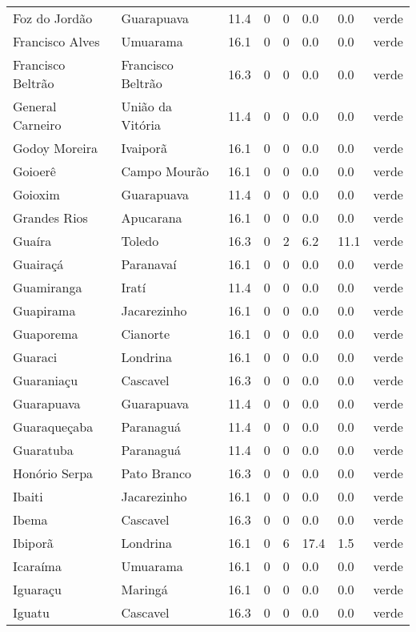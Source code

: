 \begin{longtable}{l|lllllll}
  Foz do Jordão & Guarapuava & 11.4 & 0 & 0 & 0.0 & 0.0 & verde \\ 
  Francisco Alves & Umuarama & 16.1 & 0 & 0 & 0.0 & 0.0 & verde \\ 
  Francisco Beltrão & Francisco Beltrão & 16.3 & 0 & 0 & 0.0 & 0.0 & verde \\ 
  General Carneiro & União da Vitória & 11.4 & 0 & 0 & 0.0 & 0.0 & verde \\ 
  Godoy Moreira & Ivaiporã & 16.1 & 0 & 0 & 0.0 & 0.0 & verde \\ 
  Goioerê & Campo Mourão & 16.1 & 0 & 0 & 0.0 & 0.0 & verde \\ 
  Goioxim & Guarapuava & 11.4 & 0 & 0 & 0.0 & 0.0 & verde \\ 
  Grandes Rios & Apucarana & 16.1 & 0 & 0 & 0.0 & 0.0 & verde \\ 
  Guaíra & Toledo & 16.3 & 0 & 2 & 6.2 & 11.1 & verde \\ 
  Guairaçá & Paranavaí & 16.1 & 0 & 0 & 0.0 & 0.0 & verde \\ 
  Guamiranga & Iratí & 11.4 & 0 & 0 & 0.0 & 0.0 & verde \\ 
  Guapirama & Jacarezinho & 16.1 & 0 & 0 & 0.0 & 0.0 & verde \\ 
  Guaporema & Cianorte & 16.1 & 0 & 0 & 0.0 & 0.0 & verde \\ 
  Guaraci & Londrina & 16.1 & 0 & 0 & 0.0 & 0.0 & verde \\ 
  Guaraniaçu & Cascavel & 16.3 & 0 & 0 & 0.0 & 0.0 & verde \\ 
  Guarapuava & Guarapuava & 11.4 & 0 & 0 & 0.0 & 0.0 & verde \\ 
  Guaraqueçaba & Paranaguá & 11.4 & 0 & 0 & 0.0 & 0.0 & verde \\ 
  Guaratuba & Paranaguá & 11.4 & 0 & 0 & 0.0 & 0.0 & verde \\ 
  Honório Serpa & Pato Branco & 16.3 & 0 & 0 & 0.0 & 0.0 & verde \\ 
  Ibaiti & Jacarezinho & 16.1 & 0 & 0 & 0.0 & 0.0 & verde \\ 
  Ibema & Cascavel & 16.3 & 0 & 0 & 0.0 & 0.0 & verde \\ 
  Ibiporã & Londrina & 16.1 & 0 & 6 & 17.4 & 1.5 & verde \\ 
  Icaraíma & Umuarama & 16.1 & 0 & 0 & 0.0 & 0.0 & verde \\ 
  Iguaraçu & Maringá & 16.1 & 0 & 0 & 0.0 & 0.0 & verde \\ 
  Iguatu & Cascavel & 16.3 & 0 & 0 & 0.0 & 0.0 & verde \\ 

\end{longtable}
